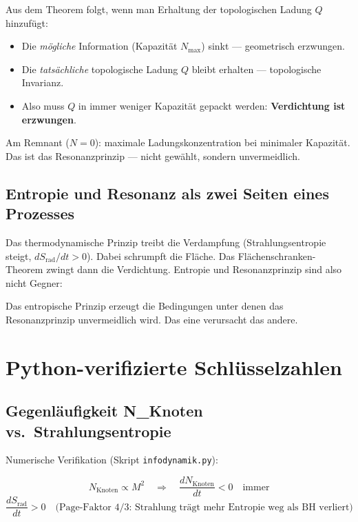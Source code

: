 Aus dem Theorem folgt, wenn man Erhaltung der topologischen Ladung $Q$ hinzufügt:

\begin{erkenntnis}
\begin{itemize}
  \item Die \emph{mögliche} Information (Kapazität $N_\text{max}$) sinkt --- geometrisch erzwungen.
  \item Die \emph{tatsächliche} topologische Ladung $Q$ bleibt erhalten --- topologische Invarianz.
  \item Also muss $Q$ in immer weniger Kapazität gepackt werden: \textbf{Verdichtung ist erzwungen}.
\end{itemize}
Am Remnant ($N = 0$): maximale Ladungskonzentration bei minimaler Kapazität. Das ist das Resonanzprinzip --- nicht gewählt, sondern unvermeidlich.
\end{erkenntnis}

\subsection{Entropie und Resonanz als zwei Seiten eines Prozesses}

Das thermodynamische Prinzip treibt die Verdampfung (Strahlungsentropie steigt, $dS_\text{rad}/dt > 0$). Dabei schrumpft die Fläche. Das Flächenschranken-Theorem zwingt dann die Verdichtung. Entropie und Resonanzprinzip sind also nicht Gegner:

\begin{erkenntnis}
Das entropische Prinzip erzeugt die Bedingungen unter denen das Resonanzprinzip unvermeidlich wird. Das eine verursacht das andere.
\end{erkenntnis}

\section{Python-verifizierte Schlüsselzahlen}

\subsection{Gegenläufigkeit N\_Knoten vs.\ Strahlungsentropie}

Numerische Verifikation (Skript \texttt{infodynamik.py}):

\begin{equation}
  N_\text{Knoten} \propto M^2 \quad \Rightarrow \quad \frac{dN_\text{Knoten}}{dt} < 0 \quad \text{immer}
\end{equation}
\begin{equation}
  \frac{dS_\text{rad}}{dt} > 0 \quad \text{(Page-Faktor 4/3: Strahlung trägt mehr Entropie weg als BH verliert)}
\end{equation}

